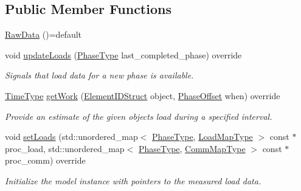 \subsection*{Public Member Functions}
\begin{DoxyCompactItemize}
\item 
\hyperlink{structvt_1_1vrt_1_1collection_1_1balance_1_1_raw_data_a4879ed47b7d3da3008dc6199adc6d519}{Raw\+Data} ()=default
\item 
void \hyperlink{structvt_1_1vrt_1_1collection_1_1balance_1_1_raw_data_a4aaae24a53ead0248b873911ce560a34}{update\+Loads} (\hyperlink{namespacevt_a46ce6733d5cdbd735d561b7b4029f6d7}{Phase\+Type} last\+\_\+completed\+\_\+phase) override
\begin{DoxyCompactList}\small\item\em Signals that load data for a new phase is available. \end{DoxyCompactList}\item 
\hyperlink{namespacevt_a876a9d0cd5a952859c72de8a46881442}{Time\+Type} \hyperlink{structvt_1_1vrt_1_1collection_1_1balance_1_1_raw_data_a2fc0e286efee8f9950a7a8ff13f3261d}{get\+Work} (\hyperlink{namespacevt_1_1vrt_1_1collection_1_1balance_a9f5b53fafb270212279a4757d2c4cd28}{Element\+I\+D\+Struct} object, \hyperlink{structvt_1_1vrt_1_1collection_1_1balance_1_1_phase_offset}{Phase\+Offset} when) override
\begin{DoxyCompactList}\small\item\em Provide an estimate of the given object\textquotesingle{}s load during a specified interval. \end{DoxyCompactList}\item 
void \hyperlink{structvt_1_1vrt_1_1collection_1_1balance_1_1_raw_data_aa29d4f35b5d3afb4690cef64fb65b887}{set\+Loads} (std\+::unordered\+\_\+map$<$ \hyperlink{namespacevt_a46ce6733d5cdbd735d561b7b4029f6d7}{Phase\+Type}, \hyperlink{namespacevt_1_1vrt_1_1collection_1_1balance_a5339303db2e1ce964d783a53fd74e6b1}{Load\+Map\+Type} $>$ const $\ast$proc\+\_\+load, std\+::unordered\+\_\+map$<$ \hyperlink{namespacevt_a46ce6733d5cdbd735d561b7b4029f6d7}{Phase\+Type}, \hyperlink{namespacevt_1_1vrt_1_1collection_1_1balance_a01ee1fb0ae2da1d2ab7fdca3be9ae351}{Comm\+Map\+Type} $>$ const $\ast$proc\+\_\+comm) override
\begin{DoxyCompactList}\small\item\em Initialize the model instance with pointers to the measured load data. \end{DoxyCompactList}\item 

\end{DoxyCompactItemize}
